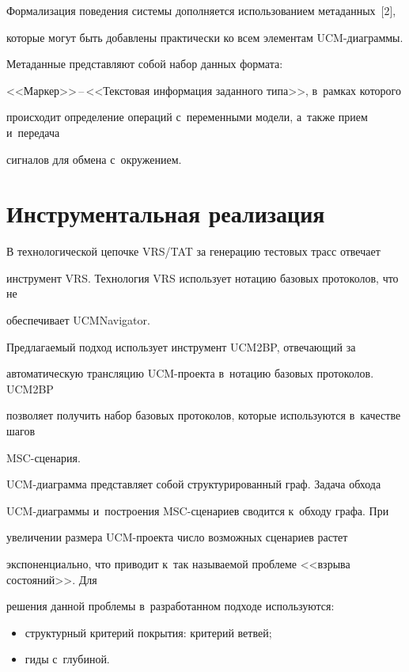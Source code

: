    Формализация поведения системы дополняется использованием метаданных~[2],


которые могут быть добавлены практически ко всем элементам UCM-диа\-грам\-мы.


Метаданные представляют собой набор данных формата:


   <<Мар\-кер>>\,--\,<<Текс\-то\-вая информация заданного типа>>, в~рамках которого


происходит определение операций с~переменными модели, а~также прием и~передача


сигналов для обмена с~окружением.





\section{Инструментальная реализация}





   В технологической цепочке VRS/TAT за генерацию тестовых трасс отвечает


инструмент VRS. Технология VRS использует нотацию базовых протоколов, что не


обеспечивает UCMNavigator.





   Предлагаемый подход использует инструмент UCM2BP, отвечающий за


автоматическую трансляцию UCM-проекта в~нотацию базовых протоколов. UCM2BP


позволяет получить набор базовых протоколов, которые используются в~качестве шагов


MSC-сце\-нария.





   UCM-диаграмма представляет собой структурированный граф. Задача обхода


   UCM-диа\-грам\-мы и~построения MSC-сце\-на\-ри\-ев сводится к~обходу графа. При


увеличении размера UCM-про\-ек\-та число возможных сценариев растет


экспоненциально, что приводит к~так называемой проблеме <<взрыва состояний>>. Для


решения данной проблемы в~разработанном подходе используются:


   \begin{itemize}


\item структурный критерий покрытия: критерий ветвей;


\item гиды с~глубиной.


\end{itemize}





